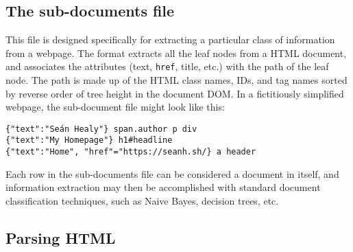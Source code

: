 \subsection{The sub-documents file\label{subd}} This file
is designed specifically for extracting a particular class of
information
from a webpage.  The format extracts all the leaf nodes from a HTML
document, and associates the attributes (text, {\tt href}, title,
etc.) with
the path of the leaf node.  The path is made up of the HTML class
names, IDs, and tag names sorted by reverse order of tree height
in the document DOM. In a fictitiously simplified webpage, the sub-document file might look
like this:
\begin{verbatim}
{"text":"Seán Healy"} span.author p div
{"text":"My Homepage"} h1#headline
{"text":"Home", "href"="https://seanh.sh/} a header
\end{verbatim}
Each row in the sub-documents file can be considered a document
in itself, and information extraction may then be accomplished with
standard document classification techniques, such as Naive Bayes,
decision trees, etc.

\subsection{Parsing HTML}